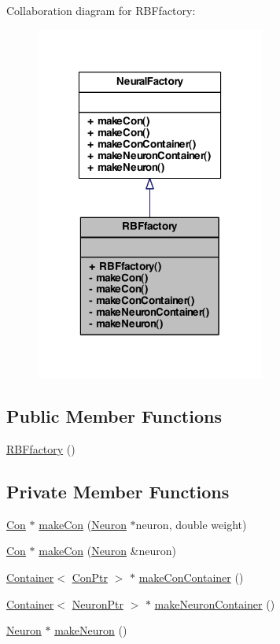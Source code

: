 Collaboration diagram for RBFfactory:
\nopagebreak
\begin{figure}[H]
\begin{center}
\leavevmode
\includegraphics[width=214pt]{class_r_b_ffactory__coll__graph}
\end{center}
\end{figure}
\subsection*{Public Member Functions}
\begin{DoxyCompactItemize}
\item 
\hyperlink{class_r_b_ffactory_af6d7b55c1c157b296f211c46f253f546}{RBFfactory} ()
\end{DoxyCompactItemize}
\subsection*{Private Member Functions}
\begin{DoxyCompactItemize}
\item 
\hyperlink{class_con}{Con} $\ast$ \hyperlink{class_r_b_ffactory_ac492116058009f39b10252afc121c225}{makeCon} (\hyperlink{class_neuron}{Neuron} $\ast$neuron, double weight)
\item 
\hyperlink{class_con}{Con} $\ast$ \hyperlink{class_r_b_ffactory_a0cb9bbdd1726e28de699eceba731808b}{makeCon} (\hyperlink{class_neuron}{Neuron} \&neuron)
\item 
\hyperlink{class_container}{Container}$<$ \hyperlink{_a_m_o_r_e_8h_a169bb8e5f26ce70bf2b10dec2fb5ee50}{ConPtr} $>$ $\ast$ \hyperlink{class_r_b_ffactory_a844c8fdc315958fdb084194f0b900c68}{makeConContainer} ()
\item 
\hyperlink{class_container}{Container}$<$ \hyperlink{_a_m_o_r_e_8h_ac1ea936c2c7728eb382278131652fef4}{NeuronPtr} $>$ $\ast$ \hyperlink{class_r_b_ffactory_a92fc16863bf60ebd93be1f108ce95ad6}{makeNeuronContainer} ()
\item 
\hyperlink{class_neuron}{Neuron} $\ast$ \hyperlink{class_r_b_ffactory_aa3514a25f378fa5e677970018d2ce65e}{makeNeuron} ()
\end{DoxyCompactItemize}



